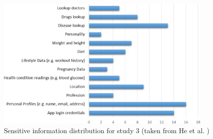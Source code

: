 \begin{figure}[hb!]
  \centering
  \includegraphics[width=0.95\textwidth]{img/sensitivedistribution.jpg}
  \caption{Sensitive information distribution for study 3 (taken from  He et al. \cite{he2014security})}
  \label{fig:sensitivedistribution}
\end{figure}


%
%
%
%

